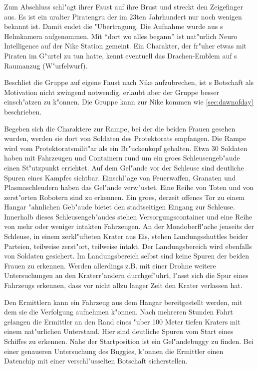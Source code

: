 Zum Abschluss schl"agt \xl{} ihrer Faust auf ihre Brust und streckt den Zeigefinger aus. Es ist ein uralter Piratengru\3 der im 23ten Jahrhundert nur noch wenigen bekannt ist. Damit endet die "Ubertragung. Die Aufnahme wurde aus \ml{}s Helmkamera aufgenommen. Mit "`dort wo alles begann"' ist nat"urlich Neuro Intelligence auf der Nike Station gemeint. Ein Charakter, der fr"uher etwas mit Piraten im G"urtel zu tun hatte, kennt eventuell das Drachen-Emblem auf \xl{}s Raumanzug (W"urfelwurf).

Beschlie\3t die Gruppe auf eigene Faust nach Nike aufzubrechen, ist \xl{}s Botschaft als Motivation nicht zwingend notwendig, erlaubt aber der Gruppe \xl{} besser einsch"atzen zu k"onnen. Die Gruppe kann zur Nike kommen wie \cref{sec:dawnofday} beschrieben.

Begeben sich die Charaktere zur Rampe, bei der die beiden Frauen gesehen wurden, werden sie dort von Soldaten des Protektorats empfangen. Die Rampe wird vom Protektoratsmilit"ar als ein Br"uckenkopf gehalten. Etwa 30 Soldaten haben mit Fahrzeugen und Containern rund um ein gro\3es Schleusengeb"aude einen St"utzpunkt errichtet. Auf dem Gel"ande vor der Schleuse sind deutliche Spuren eines Kampfes sichtbar. Einschl"age von Feuerwaffen, Granaten und Plasmaschleudern haben das Gel"ande verw"ustet. Eine Reihe von Toten und von zerst"orten Robotern sind zu erkennen. Ein gro\3es, derzeit offenes Tor zu einem Hangar "ahnlichen Geb"aude bietet den stadtseitigen Eingang zur Schleuse. Innerhalb dieses Schleusengeb"audes stehen Versorgungscontainer und eine Reihe von mehr oder weniger intakten Fahrzeugen. An der Mondoberfl"ache jenseits der Schleuse, in einem zerkl"ufteten Krater aus Eis, stehen Landungsshuttles beider Parteien, teilweise zerst"ort, teilweise intakt. Der Landungsbereich wird ebenfalls von Soldaten gesichert. Im Landungsbereich selbst sind keine Spuren der beiden Frauen zu erkennen. Werden allerdings z.B. mit einer Drohne weitere Untersuchungen an den Kraterr"andern durchgef"uhrt, l"asst sich die Spur eines Fahrzeugs erkennen, dass vor nicht allzu langer Zeit den Krater verlassen hat. 

Den Ermittlern kann ein Fahrzeug aus dem Hangar bereitgestellt werden, mit dem sie die Verfolgung aufnehmen k"onnen. Nach mehreren Stunden Fahrt gelangen die Ermittler an den Rand eines "uber 100 Meter tiefen Kraters mit einem nat"urlichen Unterstand. Hier sind deutliche Spuren vom Start eines Schiffes zu erkennen. Nahe der Startposition ist ein Gel"andebuggy zu finden. Bei einer genaueren Untersuchung des Buggies, k"onnen die Ermittler einen Datenchip mit einer verschl"usselten Botschaft sicherstellen.

